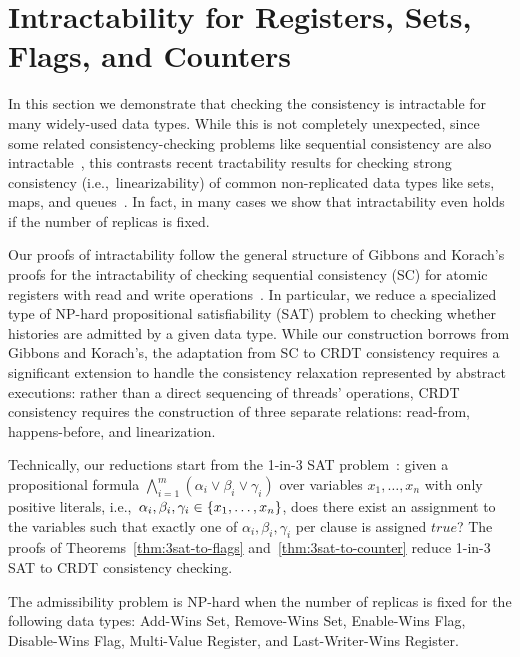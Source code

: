 
\section{Intractability for Registers, Sets, Flags, and Counters}
\label{sec:intractability}

In this section we demonstrate that checking the consistency is intractable for many widely-used data types. While this is not completely unexpected, since some related consistency-checking problems like sequential consistency are also intractable~\cite{DBLP:journals/siamcomp/GibbonsK97}, this contrasts recent tractability results for checking strong consistency (i.e.,~linearizability) of common non-replicated data types like sets, maps, and queues~\cite{DBLP:journals/pacmpl/EmmiE19}. In fact, in many cases we show that intractability even holds if the number of replicas is fixed.

Our proofs of intractability follow the general structure of Gibbons and Korach’s proofs for the intractability of checking sequential consistency (SC) for atomic registers with read and write operations~\cite{DBLP:journals/siamcomp/GibbonsK97}. In particular, we reduce a specialized type of NP-hard propositional satisfiability (SAT) problem to checking whether histories are admitted by a given data type. While our construction borrows from Gibbons and Korach’s, the adaptation from SC to CRDT consistency requires a significant extension to handle the consistency relaxation represented by abstract executions: rather than a direct sequencing of threads’ operations, CRDT consistency requires the construction of three separate relations: read-from, happens-before, and linearization.

Technically, our reductions start from the 1-in-3 SAT problem~\cite{DBLP:books/fm/GareyJ79}: given a propositional formula $\bigwedge_{i=1}^{m} (\alpha_i \lor \beta_i \lor \gamma_i)$ over variables $x_1, \ldots, x_n$ with only positive literals, i.e.,~$\alpha_i, \beta_i, \gamma_i \in {\{{ x_1, \ldots, x_n }\}}$, does there exist an assignment to the variables such that exactly one of $\alpha_i, \beta_i, \gamma_i$ per clause is assigned $\mathit{true}$? The proofs of Theorems~\ref{thm:3sat-to-flags} and~\ref{thm:3sat-to-counter} reduce 1-in-3 SAT to CRDT consistency checking.

\vspace{-1mm}
\begin{theorem}
  \label{thm:3sat-to-flags}

  The admissibility problem is NP-hard when the number of replicas is fixed for the following data types: Add-Wins Set, Remove-Wins Set, Enable-Wins Flag, Disable-Wins Flag, Multi-Value Register, and Last-Writer-Wins Register.
\vspace{-1mm}
\end{theorem}

